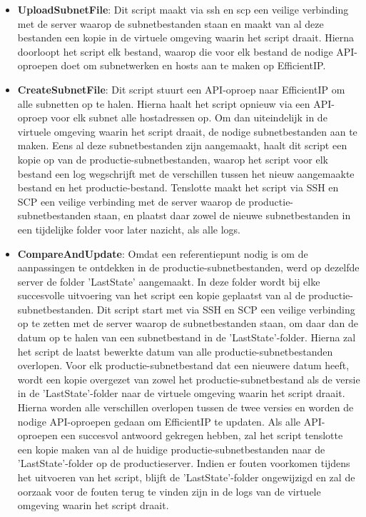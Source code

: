 \begin{itemize}
    \item \textbf{UploadSubnetFile}: Dit script maakt via \acrshort{ssh} en \acrshort{scp} een veilige verbinding met de server waarop de subnetbestanden staan en maakt van al deze bestanden een kopie in de virtuele omgeving waarin het script draait. Hierna doorloopt het script elk bestand, waarop die voor elk bestand de nodige API-oproepen doet om subnetwerken en hosts aan te maken op EfficientIP.
    \item \textbf{CreateSubnetFile}: Dit script stuurt een API-oproep naar EfficientIP om alle subnetten op te halen. Hierna haalt het script opnieuw via een API-oproep voor elk subnet alle hostadressen op. Om dan uiteindelijk in de virtuele omgeving waarin het script draait, de nodige subnetbestanden aan te maken. Eens al deze subnetbestanden zijn aangemaakt, haalt dit script een kopie op van de productie-subnetbestanden, waarop het script voor elk bestand een log wegschrijft met de verschillen tussen het nieuw aangemaakte bestand en het productie-bestand. Tenslotte maakt het script via SSH en SCP een veilige verbinding met de server waarop de productie-subnetbestanden staan, en plaatst daar zowel de nieuwe subnetbestanden in een tijdelijke folder voor later nazicht, als alle logs. 
    \item \textbf{CompareAndUpdate}: Omdat een referentiepunt nodig is om de aanpassingen te ontdekken in de productie-subnetbestanden, werd op dezelfde server de folder 'LastState' aangemaakt. In deze folder wordt bij elke succesvolle uitvoering van het script een kopie geplaatst van al de productie-subnetbestanden. Dit script start met via SSH en SCP een veilige verbinding op te zetten met de server waarop de subnetbestanden staan, om daar dan de datum op te halen van een subnetbestand in de 'LastState'-folder. Hierna zal het script de laatst bewerkte datum van alle productie-subnetbestanden overlopen. Voor elk productie-subnetbestand dat een nieuwere datum heeft, wordt een kopie overgezet van zowel het productie-subnetbestand als de versie in de 'LastState'-folder naar de virtuele omgeving waarin het script draait. Hierna worden alle verschillen overlopen tussen de twee versies en worden de nodige API-oproepen gedaan om EfficientIP te updaten. Als alle API-oproepen een succesvol antwoord gekregen hebben, zal het script tenslotte een kopie maken van al de huidige productie-subnetbestanden naar de 'LastState'-folder op de productieserver. Indien er fouten voorkomen tijdens het uitvoeren van het script, blijft de 'LastState'-folder ongewijzigd en zal de oorzaak voor de fouten terug te vinden zijn in de logs van de virtuele omgeving waarin het script draait.
\end{itemize}

